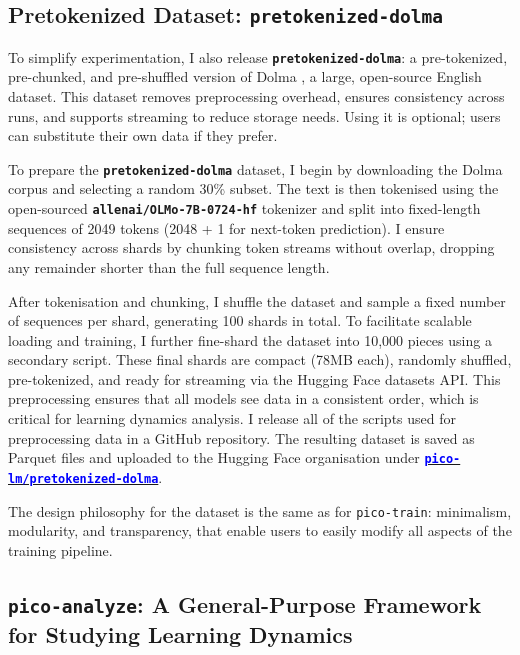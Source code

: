 \subsection{Pretokenized Dataset: \texttt{pretokenized-dolma}}

To simplify experimentation, I also release \textbf{\texttt{pretokenized-dolma}}: a pre-tokenized, pre-chunked, and pre-shuffled version of Dolma \citep{soldaini2024dolma}, a large, open-source English dataset. This dataset removes preprocessing overhead, ensures consistency across runs, and supports streaming to reduce storage needs. Using it is optional; users can substitute their own data if they prefer. 

To prepare the \textbf{\texttt{pretokenized-dolma}} dataset, I begin by downloading the Dolma corpus and selecting a random 30\% subset. The text is then tokenised using the open-sourced \textbf{\texttt{allenai/OLMo-7B-0724-hf}} tokenizer and split into fixed-length sequences of 2049 tokens (2048 + 1 for next-token prediction). I ensure consistency across shards by chunking token streams without overlap, dropping any remainder shorter than the full sequence length.

After tokenisation and chunking, I shuffle the dataset and sample a fixed number of sequences per shard, generating 100 shards in total. To facilitate scalable loading and training, I further fine-shard the dataset into 10,000 pieces using a secondary script. These final shards are compact (78MB each), randomly shuffled, pre-tokenized, and ready for streaming via the Hugging Face datasets API. This preprocessing ensures that all models see data in a consistent order, which is critical for learning dynamics analysis. I release all of the scripts used for preprocessing data in a GitHub repository. The resulting dataset is saved as Parquet files and uploaded to the Hugging Face organisation under \href{https://huggingface.co/datasets/pico-lm/pretokenized-dolma}{\textcolor{blue}{\textbf{\texttt{pico-lm/pretokenized-dolma}}}}.

The design philosophy for the dataset is the same as for \texttt{pico-train}: minimalism, modularity, and transparency, that enable users to easily modify all aspects of the training pipeline. 

\subsection{\texttt{pico-analyze}: A General-Purpose Framework for Studying Learning Dynamics}

